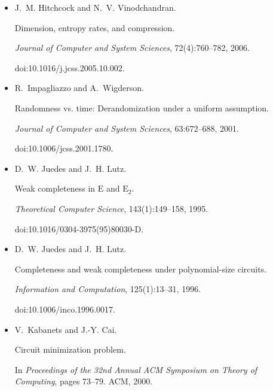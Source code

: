 \documentclass[10pt,a4paper]{article}
\begin{document}
\begin{itemize}
doi:10.4230/LIPICS.FSTTCS.2015.236.





\item[] 
[35]

J. M. Hitchcock and N. V. Vinodchandran.


Dimension, entropy rates, and compression.


\emph{Journal of Computer and System Sciences}, 72(4):760–782,
2006.


doi:10.1016/j.jcss.2005.10.002.





\item[] 
[36]

R. Impagliazzo and A. Wigderson.


Randomness vs. time: Derandomization under a uniform assumption.


\emph{Journal of Computer and System Sciences}, 63:672–688, 2001.


doi:10.1006/jcss.2001.1780.





\item[] 
[37]

D. W. Juedes and J. H. Lutz.


Weak completeness in $\mathrm{E}$ and $\mathrm{E}_{2}$.


\emph{Theoretical Computer Science}, 143(1):149–158, 1995.


doi:10.1016/0304-3975(95)80030-D.





\item[] 
[38]

D. W. Juedes and J. H. Lutz.


Completeness and weak completeness under polynomial-size circuits.


\emph{Information and Computation}, 125(1):13–31, 1996.


doi:10.1006/inco.1996.0017.





\item[] 
[39]

V. Kabanets and J.-Y. Cai.


Circuit minimization problem.


In \emph{Proceedings of the 32nd Annual ACM Symposium on Theory of
Computing}, pages 73–79. ACM, 2000.



\end{itemize}
\end{document}
